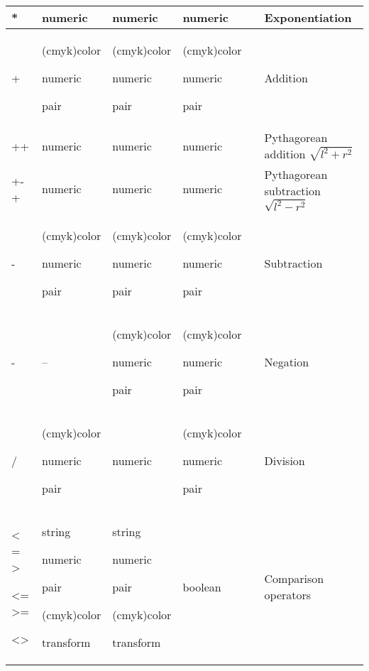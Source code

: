 \begin{longtable}{|>{\raggedright{}\ttfamily}p{.793in}*{3}{|>{\raggedright}p{.715in}}|>{\raggedleft}p{1.5em}|>{\raggedright\arraybackslash}X|}
**&  numeric&  numeric&  numeric&  \pageref{Dpow}&  Exponentiation\\\hline
+&  (cmyk)color\par numeric\par pair&  (cmyk)color\par numeric\par pair&  (cmyk)color\par numeric\par pair&  \pageref{Dadd}&  Addition\\\hline
++&  numeric&  numeric&  numeric&  \pageref{Dpyadd}&  Pythagorean addition $\sqrt{l^2+r^2}$\\\hline
+-+&  numeric&  numeric&  numeric&  \pageref{Dpysub}&  Pythagorean subtraction $\sqrt{l^2-r^2}$\\\hline
-&  (cmyk)color\par numeric\par pair&  (cmyk)color\par numeric\par pair&  (cmyk)color\par numeric\par pair&  \pageref{Dadd}&  Subtraction\\\hline
-&  --&  (cmyk)color\par numeric\par pair&  (cmyk)color\par numeric\par pair&  \pageref{Dneg}&  Negation\\\hline
/&  (cmyk)color\par numeric\par pair&  numeric&  (cmyk)color\par numeric\par pair&  \pageref{Dmldiv}&  Division\\\hline
< = >\par <= >=\par <>&  string\par numeric\par pair\par (cmyk)color\par transform&  string\par numeric\par pair\par (cmyk)color\par transform&  boolean&  \pageref{Dcmpar}&  Comparison operators\\\hline

\end{longtable}
